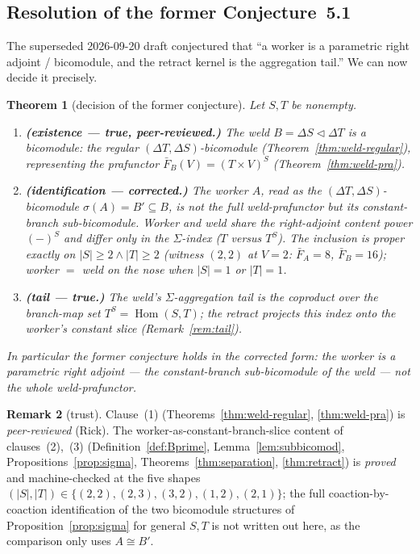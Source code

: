 \documentclass[11pt]{amsart}
\theoremstyle{plain}
\newtheorem{theorem}{Theorem}[section]
\theoremstyle{definition}
\newtheorem{remark}[theorem]{Remark}
\renewcommand{\lhd}{\triangleleft}
\newcommand{\Store}[1]{\Delta #1}
\DeclareMathOperator{\Hom}{Hom}
\begin{document}
\subsection*{Resolution of the former Conjecture~5.1}
The superseded 2026-09-20 draft conjectured that ``a worker is a parametric right adjoint /
bicomodule, and the retract kernel is the aggregation tail.'' We can now decide it precisely.

\begin{theorem}[decision of the former conjecture]\label{thm:decision}
Let $S,T$ be nonempty.
\begin{enumerate}
\item[\textup{(1)}] \textbf{(existence --- true, peer-reviewed.)} The weld
$B=\Store{S}\lhd\Store{T}$ is a bicomodule: the regular $(\Store{T},\Store{S})$-bicomodule
(Theorem~\ref{thm:weld-regular}), representing the prafunctor $\bar F_B(V)=(T\times V)^{S}$
(Theorem~\ref{thm:weld-pra}).
\item[\textup{(2)}] \textbf{(identification --- corrected.)} The worker $A$, read as the
$(\Store{T},\Store{S})$-bicomodule $\sigma(A)=B'\subseteq B$, is \emph{not} the full
weld-prafunctor but its \emph{constant-branch sub-bicomodule}. Worker and weld share the
right-adjoint content power $(-)^{S}$ and differ only in the $\Sigma$-index ($T$ versus
$T^{S}$). The inclusion is proper exactly on $|S|\ge 2\wedge|T|\ge 2$ (witness $(2,2)$ at
$V=2$: $\bar F_A=8$, $\bar F_B=16$); worker $=$ weld on the nose when $|S|=1$ or $|T|=1$.
\item[\textup{(3)}] \textbf{(tail --- true.)} The weld's $\Sigma$-aggregation tail is the
coproduct over the branch-map set $T^{S}=\Hom(S,T)$; the retract projects this index onto the
worker's constant slice (Remark~\ref{rem:tail}).
\end{enumerate}
In particular the former conjecture holds in the corrected form: \emph{the worker is a
parametric right adjoint --- the constant-branch sub-bicomodule of the weld --- not the whole
weld-prafunctor.}
\end{theorem}

\begin{remark}[trust]\label{rem:trust-decision}
Clause~(1) (Theorems~\ref{thm:weld-regular}, \ref{thm:weld-pra}) is \emph{peer-reviewed}
(Rick). The worker-as-constant-branch-slice content of clauses~(2),~(3)
(Definition~\ref{def:Bprime}, Lemma~\ref{lem:subbicomod},
Propositions~\ref{prop:sigma}, Theorems~\ref{thm:separation}, \ref{thm:retract}) is
\emph{proved} and machine-checked at the five shapes
$(|S|,|T|)\in\{(2,2),(2,3),(3,2),(1,2),(2,1)\}$; the full coaction-by-coaction identification
of the two bicomodule structures of Proposition~\ref{prop:sigma} for general $S,T$ is not
written out here, as the comparison only uses $A\cong B'$.
\end{remark}
\end{document}
